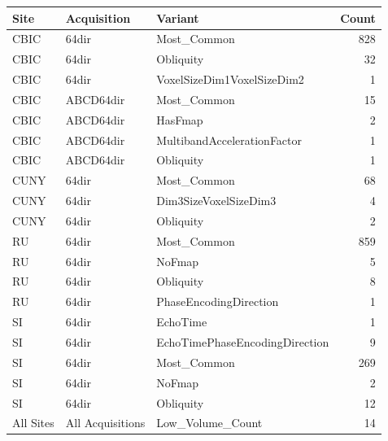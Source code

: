 \documentclass[fleqn,10pt,inline]{wlscirep}
\begin{document}
\begin{appendixbox}
\begin{tabular}{lllr}
\toprule
     Site &      Acquisition &                        Variant &  Count \\
\midrule
     CBIC &            64dir &                    Most\_Common &    828 \\
     CBIC &            64dir &                      Obliquity &     32 \\
     CBIC &            64dir &     VoxelSizeDim1VoxelSizeDim2 &      1 \\
     CBIC &        ABCD64dir &                    Most\_Common &     15 \\
     CBIC &        ABCD64dir &                        HasFmap &      2 \\
     CBIC &        ABCD64dir &    MultibandAccelerationFactor &      1 \\
     CBIC &        ABCD64dir &                      Obliquity &      1 \\
     CUNY &            64dir &                    Most\_Common &     68 \\
     CUNY &            64dir &          Dim3SizeVoxelSizeDim3 &      4 \\
     CUNY &            64dir &                      Obliquity &      2 \\
       RU &            64dir &                    Most\_Common &    859 \\
       RU &            64dir &                         NoFmap &      5 \\
       RU &            64dir &                      Obliquity &      8 \\
       RU &            64dir &         PhaseEncodingDirection &      1 \\
       SI &            64dir &                       EchoTime &      1 \\
       SI &            64dir & EchoTimePhaseEncodingDirection &      9 \\
       SI &            64dir &                    Most\_Common &    269 \\
       SI &            64dir &                         NoFmap &      2 \\
       SI &            64dir &                      Obliquity &     12 \\
All Sites & All Acquisitions &               Low\_Volume\_Count &     14 \\
\bottomrule
\end{tabular}

\end{appendixbox}
\end{document}
